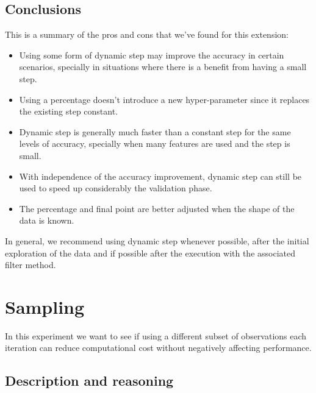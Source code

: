 \subsection{Conclusions}

This is a summary of the pros and cons that we've found for this extension:

\begin{itemize}
    \item Using some form of dynamic step may improve the accuracy in certain sce\-nar\-ios, specially in situations where there is a benefit from having a small step.
    \item Using a percentage doesn't introduce a new hyper-parameter since it replaces the existing step constant.
    \item Dynamic step is generally much faster than a constant step for the same levels of accuracy, specially when many features are used and the step is small.
    \item With independence of the accuracy improvement, dynamic step can still be used to speed up considerably the validation phase.
    \item The percentage and final point are better adjusted when the shape of the data is known.
\end{itemize}

In general, we recommend using dynamic step whenever possible, after the initial exploration of the data and if possible after the execution with the associated filter method.


\section{Sampling}

In this experiment we want to see if using a different subset of observations each iteration can reduce computational cost without negatively affecting performance.

\subsection{Description and reasoning}
\label{sec:ch5.sampling.desc}

